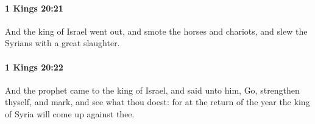 		\paragraph{1 Kings 20:21} %
			\label{1KINGS-20-21}

			And the king of Israel went out, and smote the horses and chariots, and slew the Syrians with a great slaughter.


		\paragraph{1 Kings 20:22} %
			\label{1KINGS-20-22}

			And the prophet came to the king of Israel, and said unto him, Go, strengthen thyself, and mark, and see what thou doest: for at the return of the year the king of Syria will come up against thee.


